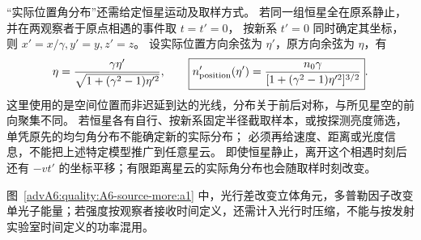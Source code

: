\begin{advsolution}
“实际位置角分布”还需给定恒星运动及取样方式。
若同一组恒星全在原系静止，并在两观察者于原点相遇的事件取 $t=t'=0$，
按新系 $t'=0$ 同时确定其坐标，则 $x'=x/\gamma,y'=y,z'=z$。
设实际位置方向余弦为 $\eta'$，原方向余弦为 $\eta$，有
\[
 \eta=\frac{\gamma\eta'}{\sqrt{1+(\gamma^2-1)\eta'^2}},\qquad
 \boxed{n'_{\rm position}(\eta')=
 \frac{n_0\gamma}{[1+(\gamma^2-1)\eta'^2]^{3/2}}}.
\]
这里使用的是空间位置而非迟延到达的光线，分布关于前后对称，与所见星空的前向聚集不同。
若恒星各有自行、按新系固定半径截取样本，或按探测亮度筛选，单凭原先的均匀角分布不能确定新的实际分布；
必须再给速度、距离或光度信息，不能把上述特定模型推广到任意星云。
即使恒星静止，离开这个相遇时刻后还有 $-vt'$ 的坐标平移；有限距离星云的实际角分布也会随取样时刻改变。

图~\ref{advA6:quality:A6-source-more:a1} 中，光行差改变立体角元，多普勒因子改变单光子能量；若强度按观察者接收时间定义，还需计入光行时压缩，不能与按发射实验室时间定义的功率混用。
\end{advsolution}

